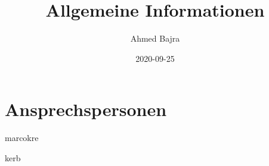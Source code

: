 \documentclass{article}
\title{Allgemeine Informationen}
\author{Ahmed Bajra}
\date{2020-09-25}
\begin{document}
    \maketitle

    \section{Ansprechspersonen}
    marcokre

    kerb
\end{document}
